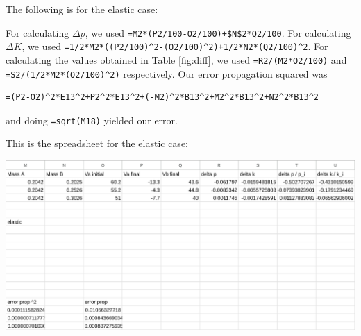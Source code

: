 \documentclass[12pt]{article}
\begin{document}
The following is for the elastic case:

For calculating \(\Delta p\), we used \texttt{=M2*(P2/100-O2/100)+\$N\$2*Q2/100}. For calculating \(\Delta K\), we used \texttt{=1/2*M2*((P2/100)\textasciicircum{}2-(O2/100)\textasciicircum{}2)+1/2*N2*(Q2/100)\textasciicircum{}2}. For calculating the values obtained in Table \ref{fig:diff}, we used \texttt{=R2/(M2*O2/100)} and \texttt{=S2/(1/2*M2*(O2/100)\textasciicircum{}2)} respectively. Our error propagation squared was
\begin{verbatim}
=(P2-O2)^2*E13^2+P2^2*E13^2+(-M2)^2*B13^2+M2^2*B13^2+N2^2*B13^2
\end{verbatim}
and doing \texttt{=sqrt(M18)} yielded our error.

This is the spreadsheet for the elastic case:

\begin{center}
\includegraphics[width=6.5in]{./elastic.png}
\end{center}
\end{document}

